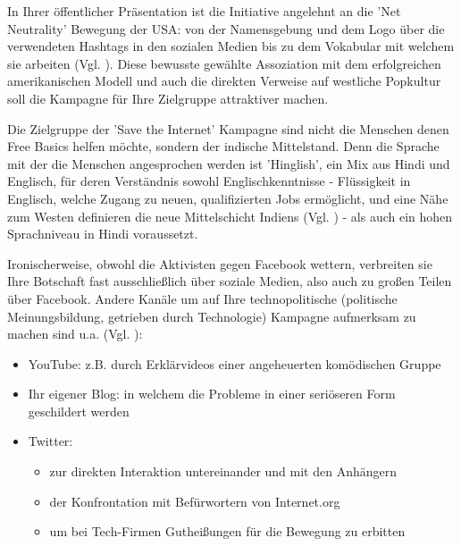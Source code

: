 \documentclass{article}
\begin{document}
In Ihrer öffentlicher Präsentation ist die Initiative angelehnt an die 'Net Neutrality' Bewegung der USA: von der Namensgebung und dem Logo über die verwendeten Hashtags in den sozialen Medien bis zu dem Vokabular mit welchem sie arbeiten (Vgl. \cite{prasad2017}). Diese bewusste gewählte Assoziation mit dem erfolgreichen amerikanischen Modell und auch die direkten Verweise auf westliche Popkultur soll die Kampagne für Ihre Zielgruppe attraktiver machen.

Die Zielgruppe der 'Save the Internet' Kampagne sind nicht die Menschen denen Free Basics helfen möchte, sondern der indische Mittelstand. Denn die Sprache mit der die Menschen angesprochen werden ist 'Hinglish', ein Mix aus Hindi und Englisch, für deren Verständnis sowohl Englischkenntnisse - Flüssigkeit in Englisch, welche Zugang zu neuen, qualifizierten Jobs ermöglicht, und eine Nähe zum Westen definieren die neue Mittelschicht Indiens (Vgl. \cite{fernandes2006}) - als auch ein hohen Sprachniveau in Hindi voraussetzt.

Ironischerweise, obwohl die Aktivisten gegen Facebook wettern, verbreiten sie Ihre Botschaft fast ausschließlich über soziale Medien, also auch zu großen Teilen über Facebook. Andere Kanäle um auf Ihre technopolitische (politische Meinungsbildung, getrieben durch Technologie) Kampagne aufmerksam zu machen sind u.a. (Vgl. \cite{prasad2017}):
\begin{itemize}
  \item YouTube: z.B. durch Erklärvideos einer angeheuerten komödischen Gruppe
  \item Ihr eigener Blog: in welchem die Probleme in einer seriöseren Form geschildert werden
  \item Twitter:
    \begin{itemize}
      \item zur direkten Interaktion untereinander und mit den Anhängern
      \item der Konfrontation mit Befürwortern von Internet.org
      \item um bei Tech-Firmen Gutheißungen für die Bewegung zu erbitten
    \end{itemize}
\end{itemize}

\end{document}
